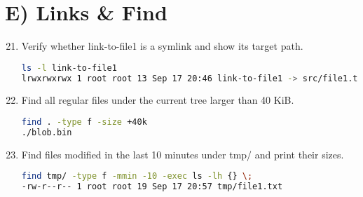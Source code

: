 \section*{E) Links \& Find}
\begin{enumerate}
\setcounter{enumi}{20}
\item Verify whether link-to-file1 is a symlink and show its target path. \vspace{2em}\\
\begin{lstlisting}[language=sh]
ls -l link-to-file1
lrwxrwxrwx 1 root root 13 Sep 17 20:46 link-to-file1 -> src/file1.txt
\end{lstlisting}
\item Find all regular files under the current tree larger than 40 KiB. \vspace{2em}\\
\begin{lstlisting}[language=sh]
find . -type f -size +40k
./blob.bin
\end{lstlisting}
\item Find files modified in the last 10 minutes under tmp/ and print their sizes. \vspace{2em}\\
\begin{lstlisting}[language=sh]
 find tmp/ -type f -mmin -10 -exec ls -lh {} \;
-rw-r--r-- 1 root root 19 Sep 17 20:57 tmp/file1.txt
\end{lstlisting}
\end{enumerate}

